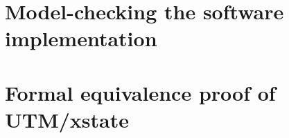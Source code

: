 \documentclass{phd-thesis}
\begin{document}
\chapter[Model-checking the implementation]{Model-checking the software implementation}\label{sec:full-model}


\chapter{Formal equivalence proof of UTM/xstate}\label{sec:hw-proof}


\backmatter

\printindex
\end{document}
